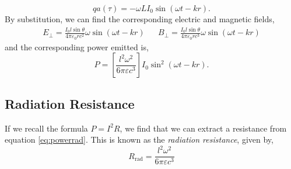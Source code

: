 \documentclass{book}
\begin{document}
\begin{equation}
	qa(\tau) = - \omega L I_0 \sin(\omega t - kr).
\end{equation}
By substitution, we can find the corresponding electric and magnetic fields,
\begin{align}
	E_{\perp} = \frac{I_0 l \sin\theta}{4\pi \varepsilon_0 rc^2}\omega \sin(\omega t - kr) && B_{\perp} = \frac{I_0 l \sin\theta}{4\pi \varepsilon_0 rc^3}\omega \sin(\omega t - kr) \label{eq:hertzian}
\end{align}
and the corresponding power emitted is,
\begin{equation}
	P = \left[\frac{l^2 \omega ^2}{6\pi \varepsilon c^3}\right]I_0 \sin^2(\omega t - kr). \label{eq:powerrad}
\end{equation}
\subsection{Radiation Resistance}
If we recall the formula $P = I^2 R$, we find that we can extract a resistance from equation \eqref{eq:powerrad}. This is known as the \textit{radiation resistance}, given by,
\begin{equation}
	R_{\text{rad}} = \frac{l^2 \omega ^2}{6\pi \varepsilon c^3}
\end{equation}
\end{document}
